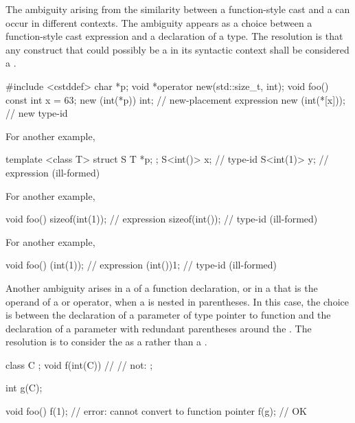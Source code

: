 \pnum
The ambiguity arising from the similarity between a function-style
cast and a
can occur in different contexts.
The ambiguity appears as a choice between a function-style cast
expression and a declaration of a type.
The resolution is that any construct that could possibly be a
in its syntactic context shall be considered a
.

\pnum
\enterexample

\begin{codeblock}
#include <cstddef>
char *p;
void *operator new(std::size_t, int);
void foo()  {
  const int x = 63;
  new (int(*p)) int;            // new-placement expression
  new (int(*[x]));              // new type-id
}
\end{codeblock}

\pnum
For another example,

\begin{codeblock}
template <class T>
struct S {
  T *p;
};
S<int()> x;                     // type-id
S<int(1)> y;                    // expression (ill-formed)
\end{codeblock}

\pnum
For another example,

\begin{codeblock}
void foo() {
  sizeof(int(1));               // expression
  sizeof(int());                // type-id (ill-formed)
}
\end{codeblock}

\pnum
For another example,

\begin{codeblock}
void foo() {
  (int(1));                     // expression
  (int())1;                     // type-id (ill-formed)
}
\end{codeblock}
\exitexample

\pnum
Another ambiguity arises in a
of a function declaration, or in a
that is the operand of a
or
operator, when a
is nested in parentheses.
In this case, the choice is between the declaration of a parameter of type
pointer to function and the declaration of a parameter with redundant
parentheses around the
.
The resolution is to consider the
as a
rather than a
.
\enterexample

\begin{codeblock}
class C { };
void f(int(C)) { }              // 
                                // not: ;

int g(C);

void foo() {
  f(1);                         // error: cannot convert  to function pointer
  f(g);                         // OK
}
\end{codeblock}

